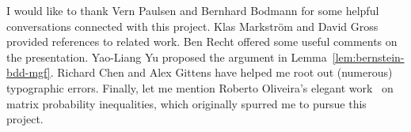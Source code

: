 \documentclass[11pt,letterpaper,twoside,reqno,draft]{amsart}
\theoremstyle{remark}
\numberwithin{equation}{section}
\numberwithin{thm}{section}
\begin{document}
I would like to thank Vern Paulsen and Bernhard Bodmann for some helpful conversations connected with this project.  Klas Markstr{\"o}m and David Gross provided references to related work.  Ben Recht offered some useful comments on the presentation.  Yao-Liang Yu proposed the argument in Lemma~\ref{lem:bernstein-bdd-mgf}.  Richard Chen and Alex Gittens have helped me root out (numerous) typographic errors.  Finally, let me mention Roberto Oliveira's elegant work~\cite{Oli10:Sums-Random} on matrix probability inequalities, which originally spurred me to pursue this project.  

  



\end{document}
